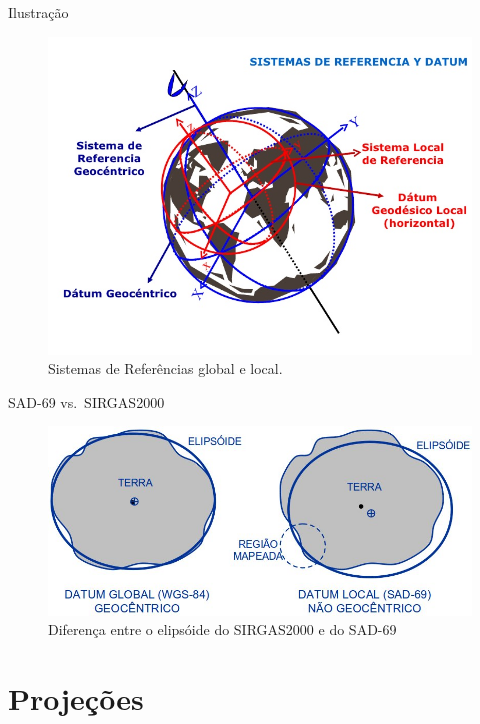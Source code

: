 \documentclass[9pt,ignorenonframetext,]{beamer}
\begin{document}
\begin{frame}{Ilustração}
\protect\hypertarget{ilustrauxe7uxe3o}{}

\begin{figure}[H]

{\centering \includegraphics[width=0.7\linewidth]{images/sistema-de-referencia} 

}

\caption{Sistemas de Referências global e local.}\label{fig:unnamed-chunk-8}
\end{figure}

\end{frame}

\begin{frame}{SAD-69 vs.~SIRGAS2000}
\protect\hypertarget{sad-69-vs.-sirgas2000}{}

\begin{figure}[H]

{\centering \includegraphics[width=0.7\linewidth]{images/sad-69-e-sirgas-WGS-84} 

}

\caption{Diferença entre o elipsóide do SIRGAS2000 e do SAD-69}\label{fig:unnamed-chunk-9}
\end{figure}

\end{frame}

\hypertarget{projeuxe7uxf5es}{%
\section{Projeções}\label{projeuxe7uxf5es}}
\end{document}
